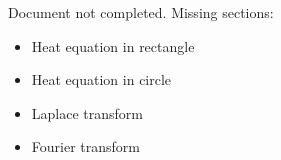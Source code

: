 \documentclass[10pt,landscape,letterpaper]{article}
\begin{document}
\begin{multicols}{3}
\vspace{10cm}\null
Document not completed. Missing sections:
\begin{itemize}
    \item Heat equation in rectangle
    \item Heat equation in circle
    \item Laplace transform
    \item Fourier transform
\end{itemize}
\end{multicols}
\end{document}
